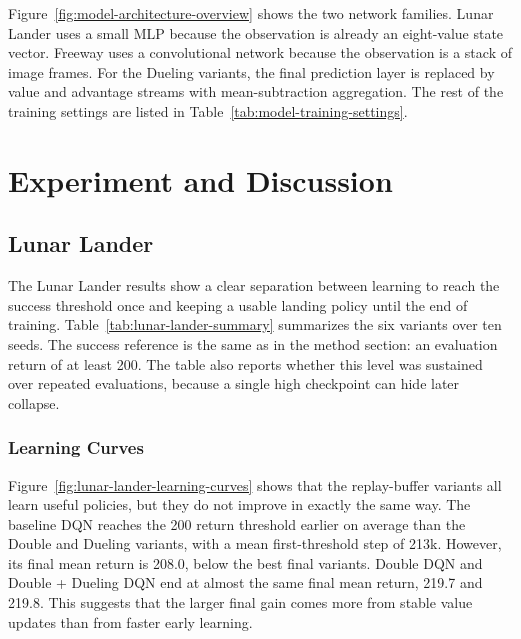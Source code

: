 \documentclass[12pt]{article}
\begin{document}
Figure~\ref{fig:model-architecture-overview} shows the two network families. Lunar Lander uses a small MLP because the observation is already an eight-value state vector. Freeway uses a convolutional network because the observation is a stack of image frames. For the Dueling variants, the final prediction layer is replaced by value and advantage streams with mean-subtraction aggregation. The rest of the training settings are listed in Table~\ref{tab:model-training-settings}.

\begin{table}[!htbp]
  \centering
  \caption{Model, training, and experiment settings for the selected result folders.}
  \label{tab:model-training-settings}
  \scriptsize
  
\end{table}

\FloatBarrier
\section{Experiment and Discussion}

\subsection{Lunar Lander}

The Lunar Lander results show a clear separation between learning to reach the success threshold once and keeping a usable landing policy until the end of training. Table~\ref{tab:lunar-lander-summary} summarizes the six variants over ten seeds. The success reference is the same as in the method section: an evaluation return of at least 200. The table also reports whether this level was sustained over repeated evaluations, because a single high checkpoint can hide later collapse.

\begin{table}[t]
  \centering
  \caption{Lunar Lander performance, retention, and stability summary over ten seeds.}
  \label{tab:lunar-lander-summary}
  \scriptsize
  
\end{table}

\subsubsection{Learning Curves}

Figure~\ref{fig:lunar-lander-learning-curves} shows that the replay-buffer variants all learn useful policies, but they do not improve in exactly the same way. The baseline DQN reaches the 200 return threshold earlier on average than the Double and Dueling variants, with a mean first-threshold step of 213k. However, its final mean return is 208.0, below the best final variants. Double DQN and Double + Dueling DQN end at almost the same final mean return, 219.7 and 219.8. This suggests that the larger final gain comes more from stable value updates than from faster early learning.
\end{document}
